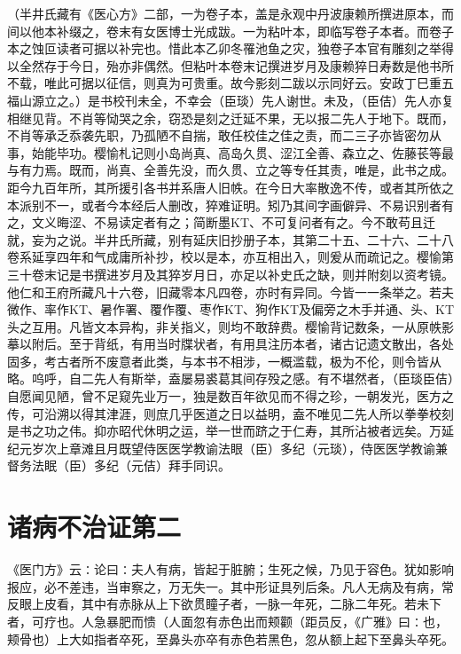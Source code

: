 \documentclass[a4paper,12pt,UTF8,twoside]{ctexbook}
\begin{document}
（半井氏藏有《医心方》二部，一为卷子本，盖是永观中丹波康赖所撰进原本，而间以他本补缀之，卷末有女医博士光成跋。一为粘叶本，即临写卷子本者。而卷子本之蚀叵读者可据以补完也。惜此本乙卯冬罹池鱼之灾，独卷子本官有雕刻之举得以全然存于今日，殆亦非偶然。但粘叶本卷末记撰进岁月及康赖猝日寿数是他书所不载，唯此可据以征信，则真为可贵重。故今影刻二跋以示同好云。安政丁巳重五福山源立之。）是书校刊未全，不幸会（臣琰）先人谢世。未及，（臣佶）先人亦复相继见背。不肖等恸哭之余，窃恐是刻之迁延不果，无以报二先人于地下。既而，不肖等承乏忝袭先职，乃孤陋不自揣，敢任校佳之佳之责，而二三子亦皆密勿从事，始能毕功。樱愉札记则小岛尚真、高岛久贯、涩江全善、森立之、佐藤苌等最与有力焉。既而，尚真、全善先没，而久贯、立之等专任其责，唯是，此书之成。距今九百年所，其所援引各书并系唐人旧帙。在今日大率散逸不传，或者其所依之本派别不一，或者今本经后人删改，猝难证明。矧乃其间字画僻异、不易识别者有之，文义晦涩、不易读定者有之；简断墨KT、不可复问者有之。今不敢苟且迁就，妄为之说。半井氏所藏，别有延庆旧抄册子本，其第二十五、二十六、二十八卷系延享四年和气成庸所补抄，校以是本，亦互相出入，则爰从而疏记之。樱愉第三十卷末记是书撰进岁月及其猝岁月日，亦足以补史氏之缺，则并附刻以资考镜。他仁和王府所藏凡十六卷，旧藏零本凡四卷，亦时有异同。今皆一一条举之。若夫微作、率作KT、暑作署、覆作覆、枣作KT、狗作KT及偏旁之木手并通、头、KT头之互用。凡皆文本异构，非关指义，则均不敢辞费。樱愉背记数条，一从原帙影摹以附后。至于背纸，有用当时牒状者，有用具注历本者，诸古记遗文散出，各处固多，考古者所不废意者此类，与本书不相涉，一概滥载，极为不伦，则令皆从略。呜呼，自二先人有斯举，盍屡易裘葛其间存殁之感。有不堪然者，（臣琰臣佶）自愿闻见陋，曾不足窥先业万一，独是数百年欲见而不得之珍，一朝发光，医方之传，可沿溯以得其津涯，则庶几乎医道之日以益明，盍不唯见二先人所以拳拳校刻是书之功之伟。抑亦昭代休明之运，举一世而跻之于仁寿，其所沾被者远矣。万延纪元岁次上章滩且月既望侍医医学教谕法眼（臣）多纪（元琰），侍医医学教谕兼督务法眠（臣）多纪（元佶）拜手同识。



\chapter{诸病不治证第二}

《医门方》云∶论曰∶夫人有病，皆起于脏腑；生死之候，乃见于容色。犹如影响报应，必不差违，当审察之，万无失一。其中形证具列后条。凡人无病及有病，常反眼上皮看，其中有赤脉从上下欲贯瞳子者，一脉一年死，二脉二年死。若未下者，可疗也。人急暴肥而愦（人面忽有赤色出而颊颧（距员反，《广雅》曰∶也，颊骨也）上大如指者卒死，至鼻头亦卒有赤色若黑色，忽从额上起下至鼻头卒死。
\end{document}
